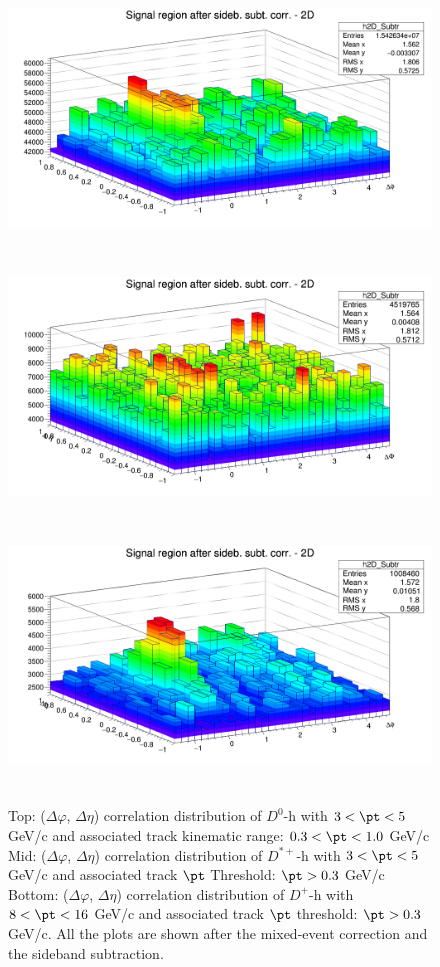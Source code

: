 \begin{figure}
\centering
{\includegraphics[width=0.9\linewidth, height = 7cm]{figures/Dzero/h2D_Dzero_Subtr_Canvas_PtIntBins4to5_PoolInt_thrdot3to99dot.png}}
{\includegraphics[width=0.9\linewidth, height = 7cm]{figures/Dstar_wEFF/h2D_Dstar_Subtr_Canvas_PtIntBins2to3_PoolInt_thr0dot3to99dot0.png}}
{\includegraphics[width=0.9\linewidth, height = 7cm]{figures/DplusPlotsweff/h2D_Dplus_Subtr_Canvas_PtIntBins8to10_PoolInt_thr0dot3to99dot0.png}}
\caption{Top: ($\Delta\varphi$, $\Delta\eta$) correlation distribution of $D^{0}$-h with $3 < \pt < 5$ GeV/c and associated track kinematic range: $0.3 < \pt < 1.0$ GeV/c
Mid: ($\Delta\varphi$, $\Delta\eta$) correlation distribution of $D^{*+}$-h with $3 < \pt < 5$ GeV/c and associated track $\pt$ Threshold: $\pt > 0.3$ GeV/c
Bottom: ($\Delta\varphi$, $\Delta\eta$) correlation distribution of $D^{+}$-h with $8 < \pt < 16$ GeV/c and associated track $\pt$ threshold: $\pt > 0.3$ GeV/c. All the plots are shown after the mixed-event correction and the sideband subtraction.}
\label{fig:Dsubtr2D}

\end{figure}
\clearpage
%


